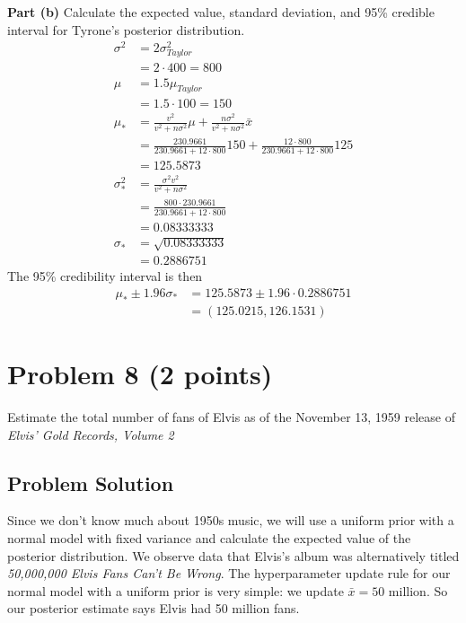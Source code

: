 \documentclass[12pt]{article}
\theoremstyle{definition}
\begin{document}
\noindent
{\bf Part (b)} Calculate the expected value, standard deviation, and 95\% credible interval for Tyrone's posterior distribution.
\begin{align*}
\sigma^2 &= 2\sigma_{Taylor}^2\\
&= 2\cdot 400 = 800\\
\mu &= 1.5 \mu_{Taylor}\\
&= 1.5 \cdot 100 = 150\\
\mu_* &= \frac{v^2}{v^2 + n\sigma^2}\mu + \frac{n\sigma^2}{v^2 + n\sigma^2}\bar{x}\\
&= \frac{230.9661}{230.9661 + 12\cdot 800}150 + \frac{12\cdot800}{230.9661 + 12\cdot800}125\\
&= 125.5873\\
\sigma_*^2 &= \frac{\sigma^2 v^2}{v^2 + n\sigma^2}\\
&= \frac{800 \cdot 230.9661}{230.9661 + 12 \cdot 800}\\
&= 0.08333333\\
\sigma_* &= \sqrt{0.08333333}\\
&= 0.2886751
\end{align*}
The 95\% credibility interval is then
\begin{align*}
\mu_* \pm 1.96\sigma_* &= 125.5873\pm 1.96\cdot 0.2886751\\
&= (125.0215, 126.1531)
\end{align*}

\newpage
\section*{Problem 8 (2 points)}

Estimate the total number of fans of Elvis as of the November 13, 1959 release of {\em Elvis' Gold Records, Volume 2}

\subsection*{Problem Solution}


Since we don't know much about 1950s music, we will use a uniform prior with a normal model with fixed variance and calculate the expected value of the posterior distribution. We observe data that Elvis's album was alternatively titled \textit{50,000,000 Elvis Fans Can't Be Wrong}. The hyperparameter update rule for our normal model with a uniform prior is very simple: we update $\bar{x} = 50$ million. So our posterior estimate says Elvis had 50 million fans.
\end{document}

